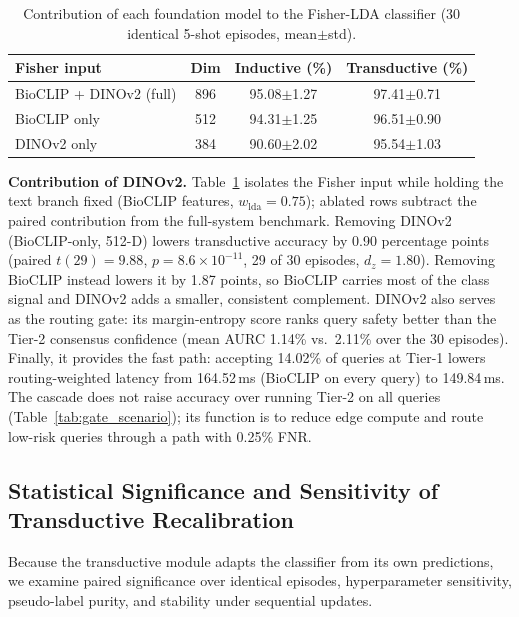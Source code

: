 \documentclass[preprint,12pt]{elsarticle}
\begin{document}
\begin{table}[htbp]
\centering
\caption{Contribution of each foundation model to the Fisher-LDA classifier (30 identical 5-shot episodes, mean$\pm$std).}
\label{tab:feature_ablation}
\footnotesize
\setlength{\tabcolsep}{4pt}
\begin{tabular*}{\columnwidth}{@{\extracolsep{\fill}}lccc}
\toprule
\textbf{Fisher input} & \textbf{Dim} & \textbf{Inductive (\%)} & \textbf{Transductive (\%)} \\
\midrule
BioCLIP + DINOv2 (full) & 896 & 95.08$\pm$1.27 & 97.41$\pm$0.71 \\
BioCLIP only & 512 & 94.31$\pm$1.25 & 96.51$\pm$0.90 \\
DINOv2 only & 384 & 90.60$\pm$2.02 & 95.54$\pm$1.03 \\
\bottomrule
\end{tabular*}
\end{table}

\textbf{Contribution of DINOv2.} Table~\ref{tab:feature_ablation} isolates the Fisher input while holding the text branch fixed (BioCLIP features, $w_{\mathrm{lda}}=0.75$); ablated rows subtract the paired contribution from the full-system benchmark. Removing DINOv2 (BioCLIP-only, 512-D) lowers transductive accuracy by 0.90 percentage points (paired $t(29)=9.88$, $p=8.6\times10^{-11}$, 29 of 30 episodes, $d_z=1.80$). Removing BioCLIP instead lowers it by 1.87 points, so BioCLIP carries most of the class signal and DINOv2 adds a smaller, consistent complement. DINOv2 also serves as the routing gate: its margin-entropy score ranks query safety better than the Tier-2 consensus confidence (mean AURC 1.14\% vs.\ 2.11\% over the 30 episodes). Finally, it provides the fast path: accepting 14.02\% of queries at Tier-1 lowers routing-weighted latency from 164.52\,ms (BioCLIP on every query) to 149.84\,ms. The cascade does not raise accuracy over running Tier-2 on all queries (Table~\ref{tab:gate_scenario}); its function is to reduce edge compute and route low-risk queries through a path with 0.25\% FNR.

\subsection{Statistical Significance and Sensitivity of Transductive Recalibration}
\label{sec:transductive_validation}
Because the transductive module adapts the classifier from its own predictions, we examine paired significance over identical episodes, hyperparameter sensitivity, pseudo-label purity, and stability under sequential updates.
\end{document}

